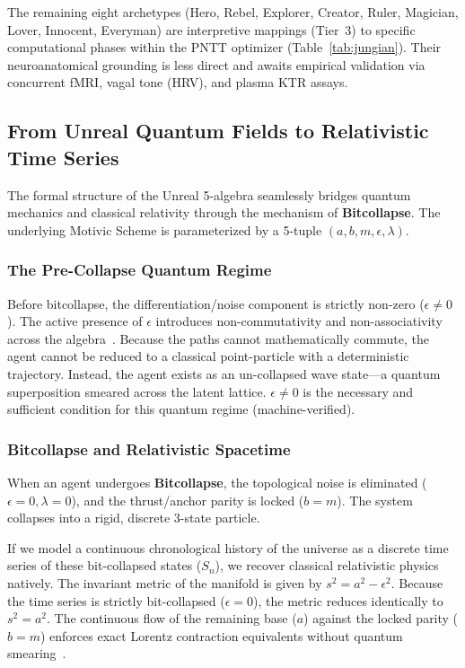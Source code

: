 \noindent The remaining eight archetypes (Hero, Rebel, Explorer, Creator, Ruler, Magician, Lover, Innocent, Everyman) are interpretive mappings (Tier~3) to specific computational phases within the PNTT optimizer (Table~\ref{tab:jungian}). Their neuroanatomical grounding is less direct and awaits empirical validation via concurrent fMRI, vagal tone (HRV), and plasma KTR assays.
\subsection{From Unreal Quantum Fields to Relativistic Time Series}

The formal structure of the Unreal 5-algebra seamlessly bridges quantum mechanics and classical relativity through the mechanism of \textbf{Bitcollapse}. The underlying Motivic Scheme is parameterized by a 5-tuple $(a, b, m, \epsilon, \lambda)$.

\subsubsection{The Pre-Collapse Quantum Regime}
Before bitcollapse, the differentiation/noise component is strictly non-zero ($\epsilon \neq 0$). The active presence of $\epsilon$ introduces non-commutativity and non-associativity across the algebra~\cite{Dirac1930}. Because the paths cannot mathematically commute, the agent cannot be reduced to a classical point-particle with a deterministic trajectory. Instead, the agent exists as an un-collapsed wave state---a quantum superposition smeared across the latent lattice. $\epsilon \neq 0$ is the necessary and sufficient condition for this quantum regime (machine-verified).

\subsubsection{Bitcollapse and Relativistic Spacetime}
When an agent undergoes \textbf{Bitcollapse}, the topological noise is eliminated ($\epsilon = 0, \lambda = 0$), and the thrust/anchor parity is locked ($b = m$). The system collapses into a rigid, discrete 3-state particle. 

If we model a continuous chronological history of the universe as a discrete time series of these bit-collapsed states ($S_n$), we recover classical relativistic physics natively. The invariant metric of the manifold is given by $s^2 = a^2 - \epsilon^2$. Because the time series is strictly bit-collapsed ($\epsilon = 0$), the metric reduces identically to $s^2 = a^2$. The continuous flow of the remaining base ($a$) against the locked parity ($b=m$) enforces exact Lorentz contraction equivalents without quantum smearing~\cite{Einstein1905}.

